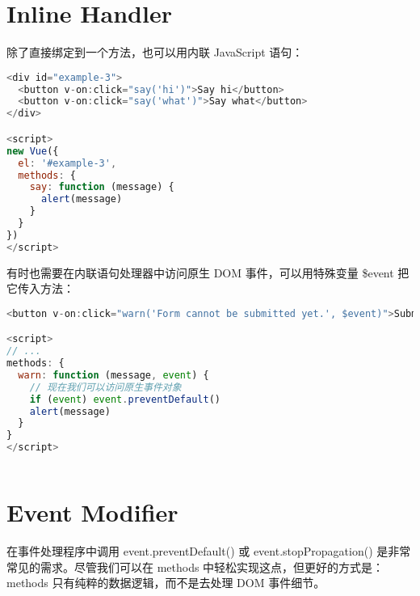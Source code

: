 \begin{lstlisting}[language=JavaScript]

\end{lstlisting}



\begin{lstlisting}[language=JavaScript]

\end{lstlisting}


\section{Inline Handler}

除了直接绑定到一个方法，也可以用内联 JavaScript 语句：

\begin{lstlisting}[language=JavaScript]
<div id="example-3">
  <button v-on:click="say('hi')">Say hi</button>
  <button v-on:click="say('what')">Say what</button>
</div>

<script>
new Vue({
  el: '#example-3',
  methods: {
    say: function (message) {
      alert(message)
    }
  }
})
</script>
\end{lstlisting}

有时也需要在内联语句处理器中访问原生 DOM 事件，可以用特殊变量 \$event 把它传入方法：

\begin{lstlisting}[language=JavaScript]
<button v-on:click="warn('Form cannot be submitted yet.', $event)">Submit</button>

<script>
// ...
methods: {
  warn: function (message, event) {
    // 现在我们可以访问原生事件对象
    if (event) event.preventDefault()
    alert(message)
  }
}
</script>
\end{lstlisting}



\begin{lstlisting}[language=JavaScript]

\end{lstlisting}


\section{Event Modifier}


在事件处理程序中调用 event.preventDefault() 或 event.stopPropagation() 是非常常见的需求。尽管我们可以在 methods 中轻松实现这点，但更好的方式是：methods 只有纯粹的数据逻辑，而不是去处理 DOM 事件细节。

